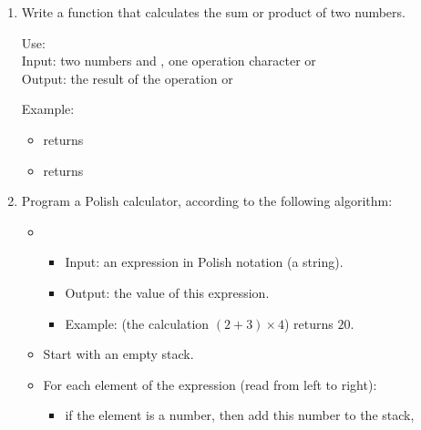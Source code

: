 \documentclass[11pt,class=report,crop=false]{standalone}
\begin{document}
\begin{activite}


\begin{enumerate}
  \item Write a function  that calculates the sum or product of two numbers.
  
  \begin{fonction}[\ci{operation()}]
  Use:  \\
  Input: two numbers  and , one operation character  or  \\
  Output: the result of the operation  or  
  
  \medskip
    
  Example: 
  \begin{itemize}
    \item {} returns 
    \item {} returns         
  \end{itemize}     
  \end{fonction}


  \item Program a Polish calculator, according to the following algorithm:
 
 \begin{algorithme}
  \sauteligne 
 \begin{itemize}
   \item
   \begin{itemize}
     \item Input: an expression in Polish notation (a string).
     \item Output: the value of this expression.
     \item Example:  (the calculation $(2+3) \times 4$) returns $20$.        
   \end{itemize}

  \item Start with an empty stack.   
   
   \item For each element of the expression (read from left to right):
   \begin{itemize}
     \item if the element is a number, then add this number to the stack,
     

\end{itemize}
\end{itemize}
\end{algorithme}
\end{enumerate}
\end{activite}
\end{document}

